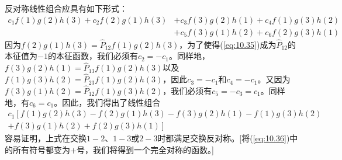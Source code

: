     反对称线性组合应具有如下形式：
    \begin{equation}
        \begin{aligned}
            c_1 f\left(1\right)g\left(2\right)h\left(3\right) + c_2 f\left(2\right)g\left(1\right)h\left(3\right) &+ c_3 f\left(3\right)g\left(2\right)h\left(1\right) + c_4 f\left(1\right)g\left(3\right)h\left(2\right) \\
            &+ c_5 f\left(3\right)g\left(1\right)h\left(2\right) + c_6 f\left(2\right)g\left(3\right)h\left(1\right)
        \end{aligned}
        \label{eq:10.35}
    \end{equation}
    因为$f\left(2\right)g\left(1\right)h\left(3\right) = \hat{P}_{12} f\left(1\right)g\left(2\right)h\left(3\right)$，为了使得(\ref{eq:10.35})成为$\hat{P}_{12}$的本征值为$-1$的本征函数，我们必须有$c_2 = -c_1$。同样地，$f\left(3\right)g\left(2\right)h\left(1\right) = \hat{P}_{13} f\left(1\right)g\left(2\right)h\left(3\right)$以及$f\left(1\right)g\left(3\right)h\left(2\right) = \hat{P}_{23} f\left(1\right)g\left(2\right)h\left(3\right)$，因此$c_3 = -c_1$和$c_4 = -c_1$。又因为$f\left(3\right)g\left(1\right)h\left(2\right) = \hat{P}_{12} f\left(1\right)g\left(3\right)h\left(2\right)$，我们必须有$c_5 = -c_3 = c_1$。同样地，有$c_6 = c_1$。因此，我们得出了线性组合
    \begin{equation}
        \begin{aligned}
            c_1 \left[ f\left(1\right)g\left(2\right)h\left(3\right) - f\left(2\right)g\left(1\right)h\left(3\right) - f\left(3\right)g\left(2\right)h\left(1\right) - f\left(1\right)g\left(3\right)h\left(2\right) \right. \\
            \left. + f\left(3\right)g\left(1\right)h\left(2\right) + f\left(2\right)g\left(3\right)h\left(1\right) \right]
        \end{aligned}
        \label{eq:10.36}
    \end{equation}
    容易证明，上式在交换$1-2$、$1-3$或$2-3$时都满足交换反对称。[将(\ref{eq:10.36})中的所有符号都变为$+$号，我们将得到一个完全对称的函数。]

